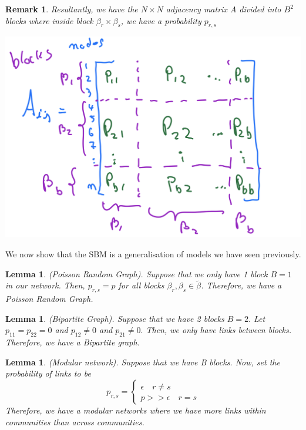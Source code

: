 \documentclass[twoside]{article}
\newtheorem{lemma}[theorem]{Lemma}
\newtheorem{remark}[theorem]{Remark}
\begin{document}
\begin{remark}
Resultantly, we have the $N \times N$ adjacency matrix A divided into $B^2$ blocks where inside block $\beta_r \times \beta_s$, we have a probability $p_{r,s}$
\end{remark}
\begin{center}
\includegraphics[scale=0.4]{SBM}
\end{center}

We now show that the SBM is a generalisation of models we have seen previously.

\begin{lemma}(Poisson Random Graph). Suppose that we only have 1 block $B = 1$ in our network. Then, $p_{r,s} = p$ for all blocks $\beta_r, \beta_s \in \tilde{\beta}$. Therefore, we have a Poisson Random Graph.
\end{lemma}

\begin{lemma}(Bipartite Graph). Suppose that we have 2 blocks $B = 2.$ Let $p_{11} = p_{22} = 0$ and $p_{12} \neq 0$ and $p_{21} \neq 0.$ Then, we only have links between blocks. Therefore, we have a Bipartite graph.
\end{lemma}

\begin{lemma}(Modular network). Suppose that we have B blocks. Now, set the probability of links to be 
$$
p_{r,s} = 
\begin{cases}
\epsilon \quad r \neq s \\
p >> \epsilon \quad r = s
\end{cases}
$$
Therefore, we have a modular networks where we have more links within communities than across communities.
\end{lemma}
\end{document}

